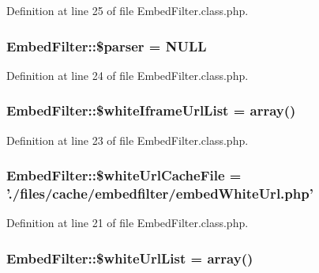 Definition at line 25 of file Embed\+Filter.\+class.\+php.

\hypertarget{classEmbedFilter_aae7e65cd7dd322d86081df16add1a5ed}{
\subsubsection[{\$parser}]{\setlength{\rightskip}{0pt plus 5cm}Embed\+Filter\+::\$parser = N\+U\+L\+L}}\label{classEmbedFilter_aae7e65cd7dd322d86081df16add1a5ed}


Definition at line 24 of file Embed\+Filter.\+class.\+php.

\hypertarget{classEmbedFilter_ad1a091dd6db8753f50b269bac16e2868}{
\subsubsection[{\$white\+Iframe\+Url\+List}]{\setlength{\rightskip}{0pt plus 5cm}Embed\+Filter\+::\$white\+Iframe\+Url\+List = array()}}\label{classEmbedFilter_ad1a091dd6db8753f50b269bac16e2868}


Definition at line 23 of file Embed\+Filter.\+class.\+php.

\hypertarget{classEmbedFilter_a2c04bd8059ab27b14923923317ad0756}{
\subsubsection[{\$white\+Url\+Cache\+File}]{\setlength{\rightskip}{0pt plus 5cm}Embed\+Filter\+::\$white\+Url\+Cache\+File = './files/cache/embedfilter/embed\+White\+Url.\+php'}}\label{classEmbedFilter_a2c04bd8059ab27b14923923317ad0756}


Definition at line 21 of file Embed\+Filter.\+class.\+php.

\hypertarget{classEmbedFilter_a3c991ef8c125e62213cc5c686712be8f}{
\subsubsection[{\$white\+Url\+List}]{\setlength{\rightskip}{0pt plus 5cm}Embed\+Filter\+::\$white\+Url\+List = array()}}\label{classEmbedFilter_a3c991ef8c125e62213cc5c686712be8f}


